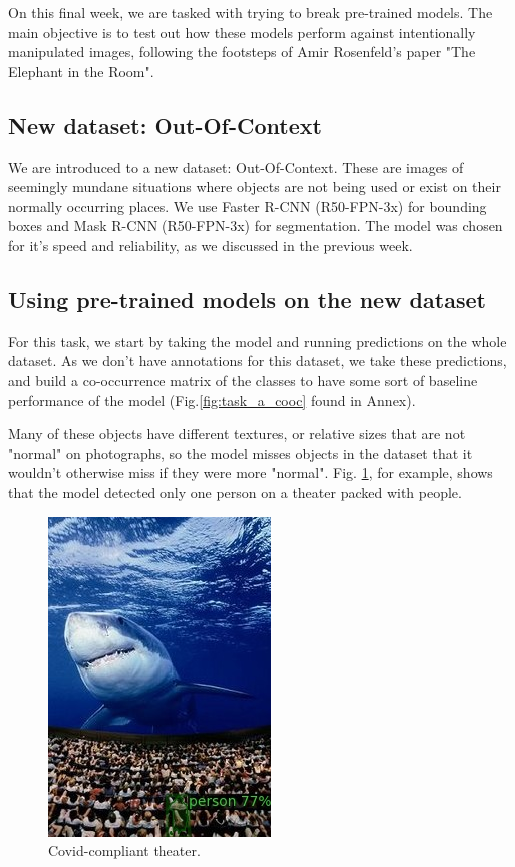 \documentclass[11pt,a4paper,twocolumn,twoside]{article}
\begin{document}
On this final week, we are tasked with trying to break pre-trained models. The main objective is to test out how these models perform against intentionally manipulated images, following the footsteps of Amir Rosenfeld's paper "The Elephant in the Room"\cite{elephantroom}.


\subsection{New dataset: Out-Of-Context}
We are introduced to a new dataset: Out-Of-Context. These are images of seemingly mundane situations where objects are not being used or exist on their normally occurring places. We use Faster R-CNN (R50-FPN-3x) for bounding boxes and Mask R-CNN (R50-FPN-3x) for segmentation. The model was chosen for it's speed and reliability, as we discussed in the previous week.

\subsection{Using pre-trained models on the new dataset}
For this task, we start by taking the model and running predictions on the whole dataset. As we don't have annotations for this dataset, we take these predictions, and build a co-occurrence matrix of the classes to have some sort of baseline performance of the model (Fig.\ref{fig:task_a_cooc} found in Annex).

Many of these objects have different textures, or relative sizes that are not "normal" on photographs, so the model misses objects in the dataset that it wouldn't otherwise miss if they were more "normal". Fig. \ref{fig:theater}, for example, shows that the model detected only one person on a theater packed with people. 


\begin{figure}[htb]
    \centering
    \includegraphics[height=0.8\linewidth]{Resources/Images/im029.jpg}
    \caption{Covid-compliant theater.}
    \label{fig:theater}
    \end{figure}
\end{document}
